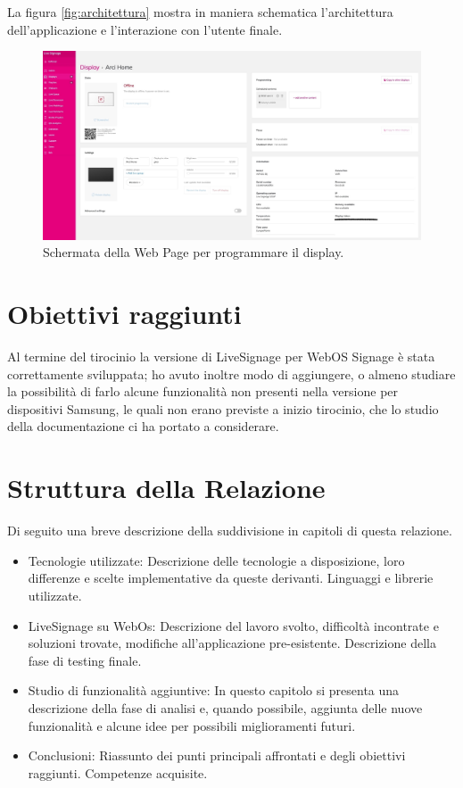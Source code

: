 La figura \ref*{fig:architettura} mostra in maniera schematica l'architettura dell'applicazione e l'interazione con l'utente finale.

\begin{figure}[!htb]
    \centering
    \includegraphics[width= 1\textwidth]{images/Introduzione/SchermataWebLS.jpg} 
    \caption{Schermata della Web Page per programmare il display.} 
    \label{fig:schermata-web}
\end{figure}

\section{Obiettivi raggiunti}

Al termine del tirocinio la versione di LiveSignage per WebOS Signage è stata correttamente sviluppata; ho avuto inoltre modo di aggiungere, o almeno studiare la possibilità di farlo alcune funzionalità non presenti nella versione per dispositivi Samsung, le quali non erano previste a inizio tirocinio, che lo studio della documentazione ci ha portato a considerare.

\section{Struttura della Relazione}
Di seguito una breve descrizione della suddivisione in capitoli di questa relazione.

\begin{itemize}
    \item Tecnologie utilizzate: Descrizione delle tecnologie a disposizione, loro differenze e scelte implementative da queste derivanti. Linguaggi e librerie utilizzate.
    \item LiveSignage su WebOs: Descrizione del lavoro svolto, difficoltà incontrate e soluzioni trovate, modifiche all'applicazione pre-esistente. Descrizione della fase di testing finale.
    \item Studio di funzionalità aggiuntive: In questo capitolo si presenta una descrizione della fase di analisi e, quando possibile, aggiunta delle nuove funzionalità e alcune idee per possibili miglioramenti futuri.
    \item Conclusioni: Riassunto dei punti principali affrontati e degli obiettivi raggiunti. Competenze acquisite.
\end{itemize}